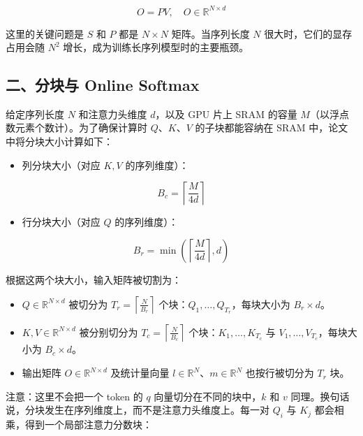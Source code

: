 \[
O = PV,\quad O \in \mathbb{R}^{N \times d}
\]

这里的关键问题是 \(S\) 和 \(P\) 都是 \(N \times N\) 矩阵。当序列长度 \(N\) 很大时，它们的显存占用会随 \(N^2\) 增长，成为训练长序列模型时的主要瓶颈。

\hypertarget{ux4e8cux5206ux5757ux4e0e-online-softmax}{%
\subsection{二、分块与 Online Softmax}\label{ux4e8cux5206ux5757ux4e0e-online-softmax}}

给定序列长度 \(N\) 和注意力头维度 \(d\)，以及 GPU 片上 SRAM 的容量 \(M\)（以浮点数元素个数计）。为了确保计算时 \(Q\)、\(K\)、\(V\) 的子块都能容纳在 SRAM 中，论文中将分块大小计算如下：

\begin{itemize}
\tightlist
\item
  列分块大小（对应 \(K,V\) 的序列维度）：
\end{itemize}

\[
B_c = \left\lceil \frac{M}{4d} \right\rceil
\]

\begin{itemize}
\tightlist
\item
  行分块大小（对应 \(Q\) 的序列维度）：
\end{itemize}

\[
B_r = \min\left(\left\lceil \frac{M}{4d} \right\rceil, d\right)
\]

根据这两个块大小，输入矩阵被切割为：

\begin{itemize}
\tightlist
\item
  \(Q \in \mathbb{R}^{N \times d}\) 被切分为 \(T_r = \left\lceil \frac{N}{B_r} \right\rceil\) 个块：\(Q_1,\ldots,Q_{T_r}\)，每块大小为 \(B_r \times d\)。
\item
  \(K,V \in \mathbb{R}^{N \times d}\) 被分别切分为 \(T_c = \left\lceil \frac{N}{B_c} \right\rceil\) 个块：\(K_1,\ldots,K_{T_c}\) 与 \(V_1,\ldots,V_{T_c}\)，每块大小为 \(B_c \times d\)。
\item
  输出矩阵 \(O \in \mathbb{R}^{N \times d}\) 及统计量向量 \(l \in \mathbb{R}^N\)、\(m \in \mathbb{R}^N\) 也按行被切分为 \(T_r\) 块。
\end{itemize}

注意：这里不会把一个 token 的 \(q\) 向量切分在不同的块中，\(k\) 和 \(v\) 同理。换句话说，分块发生在序列维度上，而不是注意力头维度上。每一对 \(Q_i\) 与 \(K_j\) 都会相乘，得到一个局部注意力分数块：

